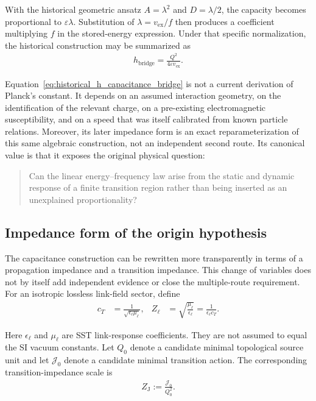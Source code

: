\documentclass[11pt]{article}
\theoremstyle{definition}
\theoremstyle{plain}
\theoremstyle{remark}
\begin{document}
With the historical geometric ansatz $A=\lambda^2$ and $D=\lambda/2$, the
capacity becomes proportional to $\varepsilon\lambda$. Substitution of
$\lambda=v_{\mathrm{ex}}/f$ then produces a coefficient multiplying $f$ in the
stored-energy expression. Under that specific normalization, the historical
construction may be summarized as
\begin{align}
    h_{\mathrm{bridge}}
    =
    \frac{Q^2}{4\varepsilon v_{\mathrm{ex}}}.
    \label{eq:historical_h_capacitance_bridge}
\end{align}

Equation~\eqref{eq:historical_h_capacitance_bridge} is not a current derivation
of Planck's constant. It depends on an assumed interaction geometry, on the
identification of the relevant charge, on a pre-existing electromagnetic
susceptibility, and on a speed that was itself calibrated from known particle
relations. Moreover, its later impedance form is an exact reparameterization of
this same algebraic construction, not an independent second route. Its canonical
value is that it exposes the original physical question:
\begin{quote}
Can the linear energy--frequency law arise from the static and dynamic response
of a finite transition region rather than being inserted as an unexplained
proportionality?
\end{quote}

\subsection{Impedance form of the origin hypothesis}
\label{subsec:impedance_form_origin_hypothesis}

The capacitance construction can be rewritten more transparently in terms of a
propagation impedance and a transition impedance. This change of variables does
not by itself add independent evidence or close the multiple-route requirement.
For an isotropic lossless
link-field sector, define
\begin{align}
    c_T
    &=
    \frac{1}{\sqrt{\epsilon_\ell\mu_\ell}},
    &
    Z_\ell
    &=
    \sqrt{\frac{\mu_\ell}{\epsilon_\ell}}
    =
    \frac{1}{\epsilon_\ell c_T}.
    \label{eq:link_speed_impedance_pair}
\end{align}

Here $\epsilon_\ell$ and $\mu_\ell$ are SST link-response coefficients. They
are not assumed to equal the SI vacuum constants. Let $Q_0$ denote a candidate
minimal topological source unit and let $\mathcal J_0$ denote a candidate
minimal transition action. The corresponding transition-impedance scale is
\begin{align}
    Z_{\mathrm J}
    :=
    \frac{\mathcal J_0}{Q_0^2}.
    \label{eq:jump_impedance_definition}
\end{align}
\end{document}
